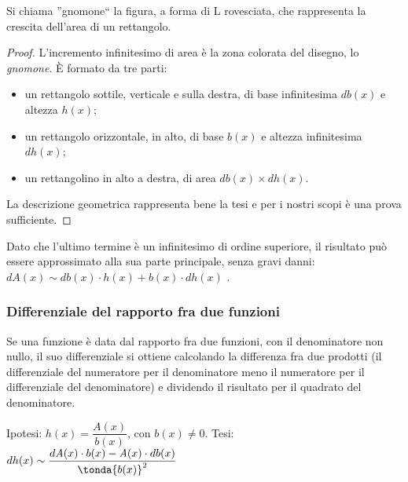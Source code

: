 \begin{osservazione}
 Si chiama ''gnomone`` la figura, a forma di L rovesciata, che rappresenta 
la 
crescita dell'area di un rettangolo.
\end{osservazione}

\begin{proof}
L'incremento infinitesimo di area è la zona colorata del disegno, lo 
\emph{gnomone}. È formato da tre parti:
\begin{itemize} [nosep, noitemsep]
 \item un rettangolo sottile, verticale e sulla destra, di base
 infinitesima $db(x)$ e altezza $h(x)$;
 \item un rettangolo orizzontale, in alto, di base $b(x)$ e
 altezza infinitesima $dh(x)$;
 \item un rettangolino in alto a destra, di area $db(x) \times dh(x)$.
\end{itemize}
La descrizione geometrica rappresenta bene la tesi e per i nostri scopi è
una prova sufficiente. 
\end{proof}
Dato che l'ultimo termine è un infinitesimo di ordine
superiore, il risultato può essere approssimato alla sua parte principale, 
senza gravi danni: $d\mathit{A}(x)\sim db(x)\cdot h(x)+b(x)\cdot dh(x)$ .

\subsubsection{Differenziale del rapporto fra due funzioni}
\label{}
\begin{teorema}
 Se una funzione è data dal rapporto fra due funzioni, con il denominatore
 non nullo, il suo  differenziale si ottiene calcolando
 la differenza fra due prodotti (il differenziale del numeratore per il 
 denominatore meno il numeratore per il differenziale del denominatore)
 e dividendo il risultato per il quadrato del denominatore.
\end{teorema}
\noindent Ipotesi: $h(x)=\dfrac{\mathit{A}(x)}{b(x)}$, con $b(x)\neq 
0$.\tab 
Tesi: 
$dh(x) \sim \dfrac{d\mathit{A}(x) \cdot b(x)-\mathit{A}(x) \cdot db(x)}
             {\tonda{b(x)}^2}$

